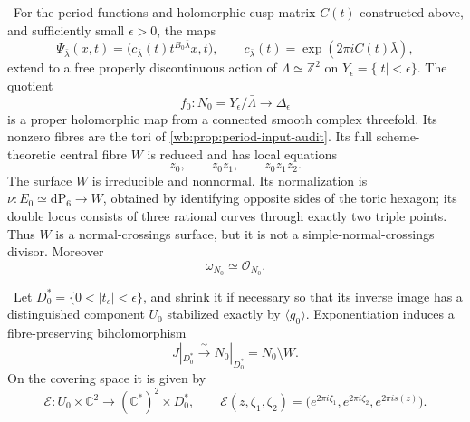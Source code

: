 \begin{theorem}
\label{wb:thm:candidate-cusp-geometry}
\ For the period functions and holomorphic cusp matrix \(C(t)\)
constructed above, and sufficiently small \(\epsilon>0\), the maps
\[
 \Psi_{\bar\lambda}(x,t)=
 \bigl(c_{\bar\lambda}(t)t^{B_0\bar\lambda}x,t\bigr),
 \qquad
 c_{\bar\lambda}(t)=\exp(2\pi iC(t)\bar\lambda),
\tag{2.5}
\]
extend to a free properly discontinuous action of
\(\bar\Lambda\simeq\mathbb Z^2\) on
\(Y_\epsilon=\{|t|<\epsilon\}\).  The quotient
\[
 f_0:N_0=Y_\epsilon/\bar\Lambda\longrightarrow\Delta_\epsilon
\]
is a proper holomorphic map from a connected smooth complex threefold.
Its nonzero fibres are the tori of \cref{wb:prop:period-input-audit}.  Its full
scheme-theoretic central fibre \(W\) is reduced and has local equations
\[
 z_0,\qquad z_0z_1,\qquad z_0z_1z_2.
\tag{2.6}
\]
The surface \(W\) is irreducible and nonnormal.  Its normalization is
\(\nu:E_0\simeq\mathrm{dP}_6\to W\), obtained by identifying opposite sides
of the toric hexagon; its double locus consists of three rational curves
through exactly two triple points.  Thus \(W\) is a normal-crossings surface,
but it is not a simple-normal-crossings divisor.  Moreover
\[
 \omega_{N_0}\simeq\mathcal O_{N_0}.
\tag{2.6a}
\]
\end{theorem}

\begin{proposition}
\label{wb:prop:candidate-cusp-overlap}
\ Let \(D_0^*=\{0<|t_c|<\epsilon\}\), and shrink it if necessary
so that its inverse image has a distinguished component \(U_0\) stabilized
exactly by \(\langle g_0\rangle\).  Exponentiation induces a
fibre-preserving biholomorphism
\[
 J|_{D_0^*}\xrightarrow{\ \sim\ }
 N_0|_{D_0^*}=N_0\setminus W.
\tag{2.8i}
\]
On the covering space it is given by
\[
 \mathcal E:U_0\times\mathbb C^2\longrightarrow
             (\mathbb C^*)^2\times D_0^*,
 \qquad
 \mathcal E(z,\zeta_1,\zeta_2)
 =\bigl(e^{2\pi i\zeta_1},e^{2\pi i\zeta_2},e^{2\pi is(z)}\bigr).
\tag{2.8ii}
\]
\end{proposition}

